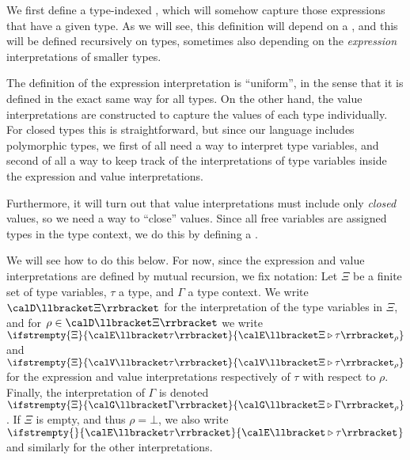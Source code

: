 \newcommand{\setSType}{\mathit{SemType}}
\newcommand{\templateInt}[4]{%
    \ifstrempty{#2}{%
        #1\llbracket#3\rrbracket%
    }{%
        #1\llbracket#2\triangleright #3\rrbracket_{#4}%
    }%
}
\newcommand{\valInt}[3]{\templateInt{\calV}{#1}{#2}{#3}}
\newcommand{\expInt}[3]{\templateInt{\calE}{#1}{#2}{#3}}
\newcommand{\conInt}[3]{\templateInt{\calG}{#1}{#2}{#3}}
\newcommand{\tvarInt}[1]{\calD\llbracket#1\rrbracket}
\newcommand{\semtype}[4]{%
    \ifstrempty{#1}{%
        #2 \vDash #3 : #4%
    }{%
        #1 \mid #2 \vDash #3 : #4%
    }%
}

We first define a type-indexed , which will somehow capture those expressions that have a given type. As we will see, this definition will depend on a , and this will be defined recursively on types, sometimes also depending on the \emph{expression} interpretations of smaller types.

The definition of the expression interpretation is \enquote{uniform}, in the sense that it is defined in the exact same way for all types. On the other hand, the value interpretations are constructed to capture the values of each type individually. For closed types this is straightforward, but since our language includes polymorphic types, we first of all need a way to interpret type variables, and second of all a way to keep track of the interpretations of type variables inside the expression and value interpretations.

Furthermore, it will turn out that value interpretations must include only \emph{closed} values, so we need a way to \enquote{close} values. Since all free variables are assigned types in the type context, we do this by defining a .

We will see how to do this below. For now, since the expression and value interpretations are defined by mutual recursion, we fix notation: Let $\Xi$ be a finite set of type variables, $\tau$ a type, and $\Gamma$ a type context. We write $\tvarInt{\Xi}$ for the interpretation of the type variables in $\Xi$, and for $\rho \in \tvarInt{\Xi}$ we write $\expInt{\Xi}{\tau}{\rho}$ and $\valInt{\Xi}{\tau}{\rho}$ for the expression and value interpretations respectively of $\tau$ with respect to $\rho$. Finally, the interpretation of $\Gamma$ is denoted $\conInt{\Xi}{\Gamma}{\rho}$. If $\Xi$ is empty, and thus $\rho = \bot$, we also write $\expInt{}{\tau}{}$ and similarly for the other interpretations.


